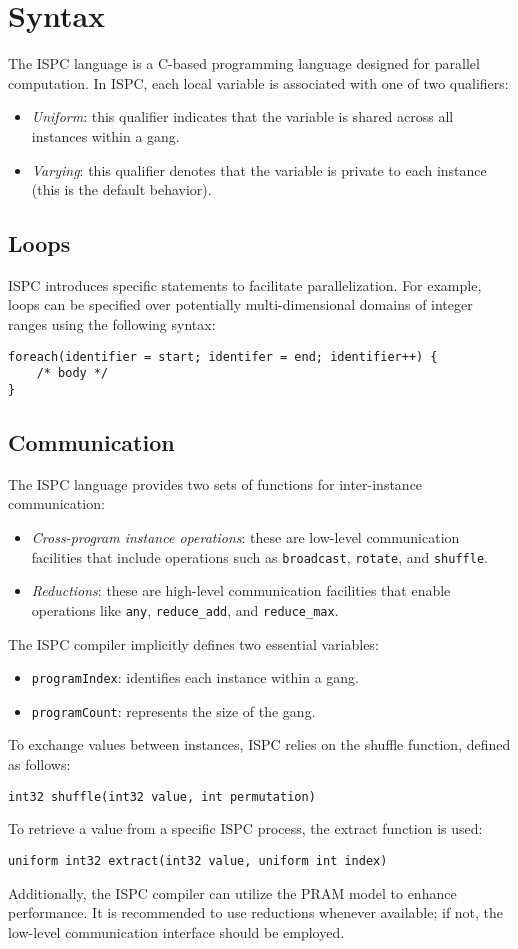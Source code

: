 \section{Syntax}

The ISPC  language is a C-based programming language designed for parallel computation. 
In ISPC, each local variable is associated with one of two qualifiers:
\begin{itemize}
    \item \textit{Uniform}: this qualifier indicates that the variable is shared across all instances within a gang.
    \item \textit{Varying}: this qualifier denotes that the variable is private to each instance (this is the default behavior).
\end{itemize}

\subsection{Loops}
ISPC introduces specific statements to facilitate parallelization. 
For example, loops can be specified over potentially multi-dimensional domains of integer ranges using the following syntax:
\begin{lstlisting}[style=ISPC]
foreach(identifier = start; identifer = end; identifier++) {
    /* body */ 
}
\end{lstlisting}

\subsection{Communication}
The ISPC language provides two sets of functions for inter-instance communication:
\begin{itemize}
    \item \textit{Cross-program instance operations}: these are low-level communication facilities that include operations such as \texttt{broadcast}, \texttt{rotate}, and \texttt{shuffle}.
    \item \textit{Reductions}: these are high-level communication facilities that enable operations like \texttt{any}, \texttt{reduce\_add}, and \texttt{reduce\_max}. 
\end{itemize}

The ISPC compiler implicitly defines two essential variables:
\begin{itemize}
    \item \texttt{programIndex}: identifies each instance within a gang.
    \item \texttt{programCount}: represents the size of the gang.
\end{itemize}
To exchange values between instances, ISPC relies on the shuffle function, defined as follows:
\begin{lstlisting}[style=ISPC]
int32 shuffle(int32 value, int permutation)
\end{lstlisting}
To retrieve a value from a specific ISPC process, the extract function is used:
\begin{lstlisting}[style=ISPC]
uniform int32 extract(int32 value, uniform int index)
\end{lstlisting}

Additionally, the ISPC compiler can utilize the PRAM model to enhance performance. 
It is recommended to use reductions whenever available; if not, the low-level communication interface should be employed.
